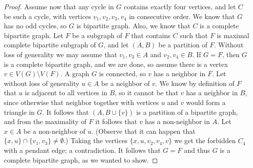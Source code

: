 \documentclass{svproc}
\begin{document}
\begin{proof}
Assume now that any cycle in $G$ contains exactly four vertices, and let $C$ be such a cycle, with vertices $v_1,v_2,v_3,v_4$ in consecutive order. 
We know that $G$ has no odd cycles, so $G$ is bipartite graph. Also, we know that $C$ is a complete bipartite graph. Let $F$ be a subgraph of $F$ that contains $C$ such that $F$ is maximal complete bipartite subgraph of $G$, and let $(A,B)$ be a partition of $F$. Without loss of generality we may assume that $v_1,v_3\in A$ and $v_2,v_4\in B$. If $G=F$, then $G$ is a complete bipartite graph, and we are done, so assume there is a vertex $v\in V(G)\setminus V(F)$. A graph $G$ is connected, so $v$ has a neighbor in $F$. Let without loss of generality $u\in A$ be a neighbor of $v$. We know by definition of $F$ that $u$ is adjacent to all vertices in $B$, so it cannot be that $v$ has a neighbor in $B$, since otherwise that neighbor together with vertices $u$ and $v$ would form a triangle in $G$. It follows that $(A, B\cup \{v\})$ is a partition of a bipartite graph, and from the maximality of $F$ it follows that $v$ has a non-neighbor in $A$. Let $x\in A$ be a non-neighbor of $u$. (Observe that it can happen that $\{x,u\}\cap \{v_1,v_3\}\neq \emptyset$.) Taking the vertices $\{x,u,v_2,v_4,v\}$ we get the forbidden $C_4$ with a pendant edge; a contradiction. It follows that $G=F$ and thus $G$ is a complete bipartite graph, as we wanted to show.
\end{proof}
%


\end{document}
